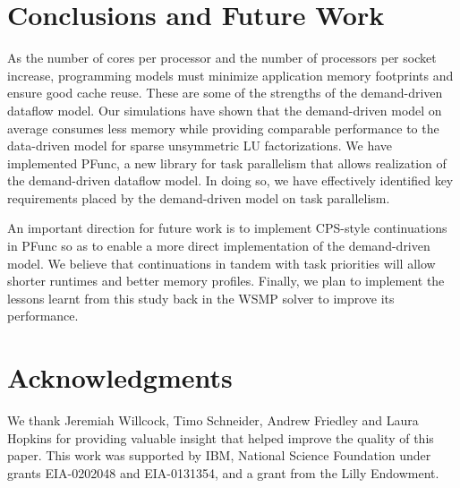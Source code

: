 \documentclass[10pt,conference]{IEEEtran}
\begin{document}
\section{Conclusions and Future Work}
\label{sec:conclusion}
As the number of cores per processor and the number of processors per socket
increase, programming models must minimize application memory footprints and
ensure good cache reuse. These are some of the strengths of the demand-driven
dataflow model. Our simulations have shown that the demand-driven model on
average consumes less memory while providing comparable performance to the
data-driven model for sparse unsymmetric LU factorizations. We have implemented
PFunc, a new library for task parallelism that allows realization of the
demand-driven dataflow model. In doing so, we have effectively identified key
requirements placed by the demand-driven model on task parallelism.

An important direction for future work is to implement CPS-style continuations
in PFunc so as to enable a more direct implementation of the demand-driven
model.  We believe that continuations in tandem with task priorities will allow
shorter runtimes and better memory profiles.  Finally, we plan to implement the
lessons learnt from this study back in the WSMP solver to improve its
performance.

\section{Acknowledgments}
\label{sec:ack}
We thank Jeremiah Willcock, Timo Schneider, Andrew Friedley and Laura Hopkins
for providing valuable insight that helped improve the quality of this paper.
This work was supported by IBM, National Science Foundation under grants
EIA-0202048 and EIA-0131354, and a grant from the Lilly Endowment.



\end{document}
